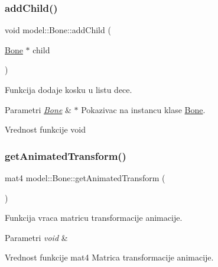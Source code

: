 \subsubsection{\texorpdfstring{add\+Child()}{addChild()}}
{\footnotesize\ttfamily void model\+::\+Bone\+::add\+Child (\begin{DoxyParamCaption}\item[{\hyperlink{classmodel_1_1Bone}{Bone} $\ast$}]{child }\end{DoxyParamCaption})}



Funkcija dodaje kosku u listu dece. 


\begin{DoxyParams}{Parametri}
{\em \hyperlink{classmodel_1_1Bone}{Bone}} & $\ast$ Pokazivac na instancu klase \hyperlink{classmodel_1_1Bone}{Bone}. \\
\hline
\end{DoxyParams}
\begin{DoxyReturn}{Vrednost funkcije}
void 
\end{DoxyReturn}
\mbox{\label{classmodel_1_1Bone_a2fc96bf7f7ce0e061ae3b4ada72ed9b7}} 
\subsubsection{\texorpdfstring{get\+Animated\+Transform()}{getAnimatedTransform()}}
{\footnotesize\ttfamily mat4 model\+::\+Bone\+::get\+Animated\+Transform (\begin{DoxyParamCaption}{ }\end{DoxyParamCaption})}



Funkcija vraca matricu transformacije animacije. 


\begin{DoxyParams}{Parametri}
{\em void} & \\
\hline
\end{DoxyParams}
\begin{DoxyReturn}{Vrednost funkcije}
mat4 Matrica transformacije animacije. 
\end{DoxyReturn}
\mbox{\label{classmodel_1_1Bone_a00f7c97175801fdf9ecb58e638cee673}} 
